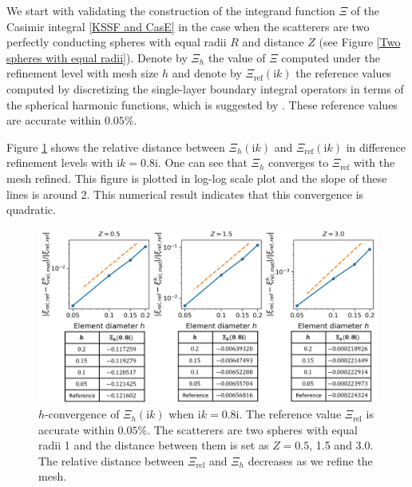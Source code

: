 {\color{teal} We start with validating the construction of the integrand function $\Xi$ of the Casimir integral \eqref{KSSF and CasE} in the case when the scatterers
are two perfectly conducting spheres with equal radii $R$ and distance $Z$ (see Figure \ref{Two spheres with equal radii}). 
Denote by $\Xi_{h}$ the value of $\Xi$ computed under the refinement level with mesh size $h$ and denote by  $\Xi_{\text{ref}}(\mathrm{i}k)$ the
reference values computed by discretizing the single-layer boundary integral operators in terms of the spherical harmonic functions, 
which is suggested by \cite{kenneth2008casimir}. These reference values are accurate within $0.05\%$.


Figure \ref{Scalar_Xi_h_conv} shows the relative distance between $\Xi_{h}(\mathrm{i}k)$ and $\Xi_{\text{ref}}(\mathrm{i}k)$ in difference 
refinement levels with $\mathrm{i}k = 0.8\mathrm{i}$. One can see that $\Xi_{h}$ converges to $\Xi_{\text{ref}}$ with the mesh refined. 
This figure is plotted in log-log scale plot and the slope of these lines is around 2. This numerical result indicates that this convergence is quadratic.}

\begin{figure}[H]
    \centering
    \includegraphics[width = \textwidth]{figures/Scalar_Xi_h_conv_paper.png}
    \caption{$h$-convergence of $\Xi_{h}(\mathrm{i}k)$ when $\mathrm{i}k = 0.8\mathrm{i}$. The reference value $\Xi_{\text{rel}}$ is accurate within $0.05\%$. The scatterers are two spheres with equal radii 1 and the distance between them is set as $Z = 0.5$, 1.5 and 3.0.
    The relative distance between $\Xi_{\text{rel}}$ and $\Xi_{h}$ decreases as we refine the mesh.}
    \label{Scalar_Xi_h_conv}
\end{figure}

